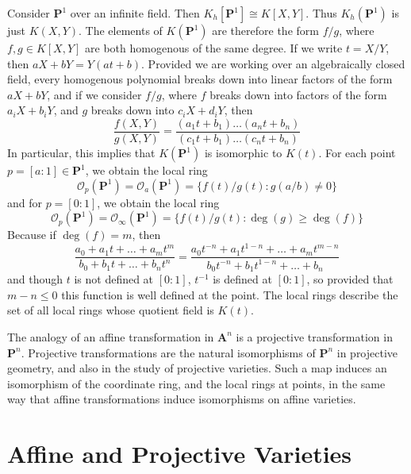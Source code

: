 \begin{example}
    Consider $\mathbf{P}^1$ over an infinite field. Then $K_h[\mathbf{P}^1] \cong K[X,Y]$. Thus $K_h(\mathbf{P}^1)$ is just $K(X,Y)$. The elements of $K(\mathbf{P}^1)$ are therefore the form $f/g$, where $f,g \in K[X,Y]$ are both homogenous of the same degree. If we write $t = X/Y$, then $aX + bY = Y(at + b)$. Provided we are working over an algebraically closed field, every homogenous polynomial breaks down into linear factors of the form $aX + bY$, and if we consider $f/g$, where $f$ breaks down into factors of the form $a_iX + b_iY$, and $g$ breaks down into $c_iX + d_iY$, then
    \[ \frac{f(X,Y)}{g(X,Y)} = \frac{(a_1t + b_1) \dots (a_nt + b_n)}{(c_1t + b_1) \dots (c_nt + b_n)} \]
    In particular, this implies that $K(\mathbf{P}^1)$ is isomorphic to $K(t)$. For each point $p = [a:1] \in \mathbf{P}^1$, we obtain the local ring
    \[ \mathcal{O}_p(\mathbf{P}^1) = \mathcal{O}_a(\mathbf{P}^1) = \{ f(t)/g(t) : g(a/b) \neq 0 \} \]
    and for $p = [0:1]$, we obtain the local ring
    \[ \mathcal{O}_p(\mathbf{P}^1) = \mathcal{O}_\infty(\mathbf{P}^1) = \{  f(t)/g(t) : \deg(g) \geq \deg(f) \} \]
    Because if $\deg(f) = m$, then
    \[ \frac{a_0 + a_1t + \dots + a_mt^m}{b_0 + b_1t + \dots + b_nt^n} = \frac{a_0t^{-n} + a_1t^{1-n} + \dots + a_mt^{m-n}}{b_0t^{-n} + b_1t^{1-n} + \dots + b_n} \]
    and though $t$ is not defined at $[0:1]$, $t^{-1}$ is defined at $[0:1]$, so provided that $m-n \leq 0$ this function is well defined at the point. The local rings describe the set of all local rings whose quotient field is $K(t)$.
\end{example}

The analogy of an affine transformation in $\mathbf{A}^n$ is a projective transformation in $\mathbf{P}^n$. Projective transformations are the natural isomorphisms of $\mathbf{P}^n$ in projective geometry, and also in the study of projective varieties. Such a map induces an isomorphism of the coordinate ring, and the local rings at points, in the same way that affine transformations induce isomorphisms on affine varieties.

\section{Affine and Projective Varieties}

